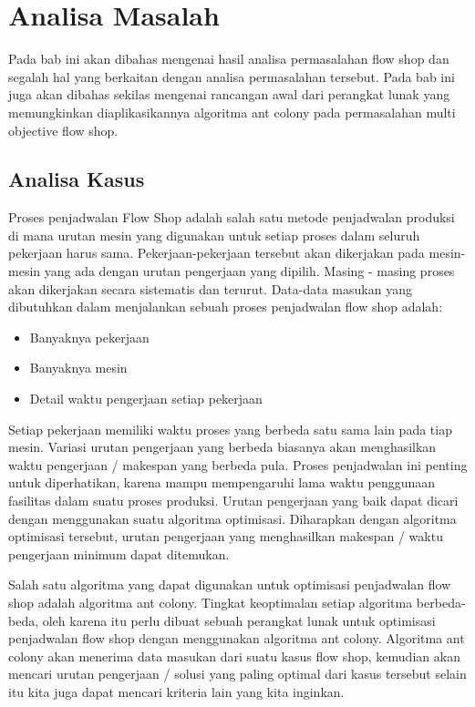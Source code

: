 \chapter{Analisa Masalah}
\label{chap:analisa}

	Pada bab ini akan dibahas mengenai hasil analisa permasalahan flow shop dan segalah hal yang berkaitan dengan analisa permasalahan tersebut.
	Pada bab ini juga akan dibahas sekilas mengenai rancangan awal dari perangkat lunak yang memungkinkan diaplikasikannya
	algoritma ant colony pada permasalahan multi objective flow shop.
	
	
\section{Analisa Kasus}

	Proses penjadwalan Flow Shop adalah salah satu metode penjadwalan produksi di mana urutan mesin 
	yang digunakan untuk setiap proses dalam seluruh pekerjaan harus sama. Pekerjaan-pekerjaan tersebut
	akan dikerjakan pada mesin-mesin yang ada dengan urutan pengerjaan yang dipilih. Masing - masing
	proses akan dikerjakan secara sistematis dan terurut. Data-data masukan yang dibutuhkan
	dalam menjalankan sebuah proses penjadwalan flow shop adalah:
	\begin{itemize}
		\item Banyaknya pekerjaan
		\item Banyaknya mesin
		\item Detail waktu pengerjaan setiap pekerjaan
		
	\end{itemize}

	Setiap pekerjaan memiliki waktu proses yang berbeda satu sama lain pada tiap mesin. Variasi
	urutan pengerjaan yang berbeda biasanya akan menghasilkan waktu pengerjaan / makespan yang
	berbeda pula. Proses penjadwalan ini penting untuk diperhatikan, karena mampu mempengaruhi
	lama waktu penggunaan fasilitas dalam suatu proses produksi. Urutan pengerjaan yang baik dapat
	dicari dengan menggunakan suatu algoritma optimisasi. Diharapkan dengan algoritma optimisasi
	tersebut, urutan pengerjaan yang menghasilkan makespan / waktu pengerjaan minimum dapat
	ditemukan.
	
	Salah satu algoritma yang dapat digunakan untuk optimisasi penjadwalan flow shop
	adalah algoritma ant colony. Tingkat keoptimalan setiap algoritma berbeda-beda, oleh karena
	itu perlu dibuat sebuah perangkat lunak untuk optimisasi penjadwalan flow shop dengan
	menggunakan algoritma ant colony. Algoritma ant colony akan menerima data masukan dari suatu
	kasus flow shop, kemudian akan mencari urutan pengerjaan / solusi yang paling optimal dari
	kasus tersebut selain itu kita juga dapat mencari kriteria lain yang kita inginkan.
	
